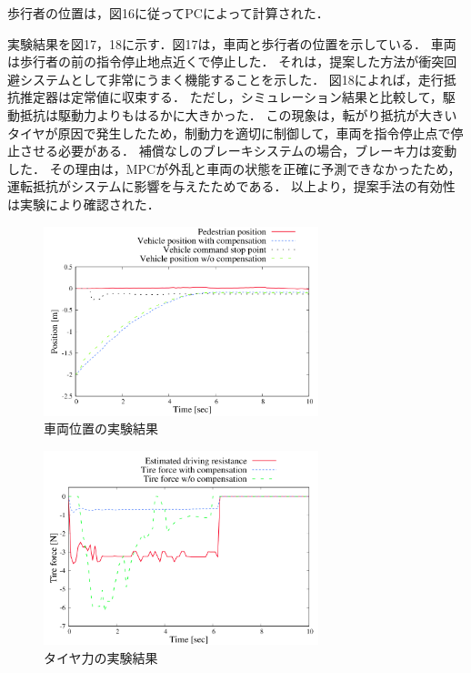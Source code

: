 歩行者の位置は，図16に従ってPCによって計算された．

実験結果を図17，18に示す．図17は，車両と歩行者の位置を示している． 車両は歩行者の前の指令停止地点近くで停止した． それは，提案した方法が衝突回避システムとして非常にうまく機能することを示した． 図18によれば，走行抵抗推定器は定常値に収束する． ただし，シミュレーション結果と比較して，駆動抵抗は駆動力よりもはるかに大きかった． この現象は，転がり抵抗が大きいタイヤが原因で発生したため，制動力を適切に制御して，車両を指令停止点で停止させる必要がある． 補償なしのブレーキシステムの場合，ブレーキ力は変動した． その理由は，MPCが外乱と車両の状態を正確に予測できなかったため，運転抵抗がシステムに影響を与えたためである． 以上より，提案手法の有効性は実験により確認された．
\begin{figure}[H]
    \centering
    \includegraphics[width=8cm]{./fig/fig17.png}
    \caption{車両位置の実験結果}
\end{figure}
\begin{figure}[H]
    \centering
    \includegraphics[width=8cm]{./fig/fig18.png}
    \caption{タイヤ力の実験結果}
\end{figure}

